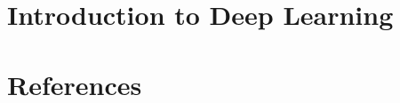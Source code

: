 % 

\section[Intro]{Introduction to Deep Learning}

% 
% 
% 

% 
% 
% 

% 
% 

% 
% 

 
 
% 


 \section[Refs]{References}
 
